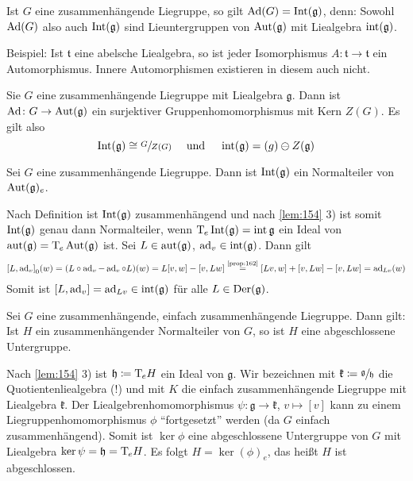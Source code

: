 Ist $G$ eine zusammenhängende Liegruppe, so gilt $\Ad(G) = \Int(\mathfrak{g})$, denn: Sowohl $\Ad(G)$ also auch $\Int(\mathfrak{g})$ sind Lieuntergruppen von $\Aut(\mathfrak{g})$ mit Liealgebra $\intAlg(\mathfrak{g})$.

Beispiel: Ist $\mathfrak{t}$ eine abelsche Liealgebra, so ist jeder Isomorphismus $A \colon \mathfrak{t} \to \mathfrak{t}$ ein Automorphismus.
Innere Automorphismen existieren in diesem auch nicht.

\begin{lemma}
	Sie $G$ eine zusammenhängende Liegruppe mit Liealgebra $\mathfrak{g}$.
	Dann ist $\Ad \colon G \to \Aut(\mathfrak{g})$ ein surjektiver Gruppenhomomorphismus mit Kern $Z(G)$.
	Es gilt also
	\[
		\Int(\mathfrak{g}) \cong \sfrac{G}{Z(G)} \quad \text{ und } \quad \intAlg(\mathfrak{g}) = \mathfrak(g) \ominus Z(\mathfrak{g})
	\]
\end{lemma}

\begin{lemma}[label=lem:165]
	Sei $G$ eine zusammenhängende Liegruppe.
	Dann ist $\Int(\mathfrak{g})$ ein Normalteiler von $\Aut(\mathfrak{g})_e$.
\end{lemma}
\begin{beweis}
	Nach Definition ist $\Int(\mathfrak{g})$ zusammenhängend und nach \autoref{lem:154} 3) ist somit $\Int(\mathfrak{g})$ genau dann Normalteiler, wenn $\Tmap_e \Int(\mathfrak{g}) = \intAlg{\mathfrak{g}}$ ein Ideal von $\aut(\mathfrak{g}) = \Tmap_e \Aut(\mathfrak{g})$ ist.
	Sei $L \in \aut(\mathfrak{g})$, $\ad_v \in \intAlg(\mathfrak{g})$.
	Dann gilt
	\begin{align}
		\benbrace*{L,\ad_v}_0 (w) = \enbrace*{L \circ \ad_v - \ad_v \circ L}(w) = L \benbrace*{v,w}- \benbrace*{v,Lw} \StackText{\ref{prop:162}}{=} \benbrace*{Lv, w} + \benbrace*{v,Lw} - \benbrace*{v,Lw} 
		= \ad_{Lv}(w)
	\end{align}
	Somit ist $\benbrace*{L, \ad_v} = \ad_{Lv} \in \intAlg(\mathfrak{g})$ für alle $L \in \Der(\mathfrak{g})$.
\end{beweis}

\begin{lemma}
	Sei $G$ eine zusammenhängende, einfach zusammenhängende Liegruppe.
	Dann gilt: Ist $H$ ein zusammenhängender Normalteiler von $G$, so ist $H$ eine abgeschlossene Untergruppe.
\end{lemma}
\begin{beweis}
	Nach \autoref{lem:154} 3) ist $\mathfrak{h} \coloneqq \Tmap_e H$ ein Ideal von $\mathfrak{g}$.
	Wir bezeichnen mit $\mathfrak{k} \coloneqq \sfrac{\mathfrak{g}}{\mathfrak{h}}$ die Quotientenliealgebra (!) und mit $K$ die einfach zusammenhängende Liegruppe mit Liealgebra $\mathfrak{k}$.
	Der Liealgebrenhomomorphismus $\psi \colon \mathfrak{g} \to \mathfrak{k}$, $v \mapsto [v]$ kann zu einem Liegruppenhomomorphismus $\phi$ \enquote{fortgesetzt} werden (da $G$ einfach zusammenhängend).
	Somit ist $\ker \phi$ eine abgeschlossene Untergruppe von $G$ mit Liealgebra $\ker \psi= \mathfrak{h}= \Tmap_e H$.
	Es folgt $H= \ker (\phi)_e$, das heißt $H$ ist abgeschlossen.
\end{beweis}

